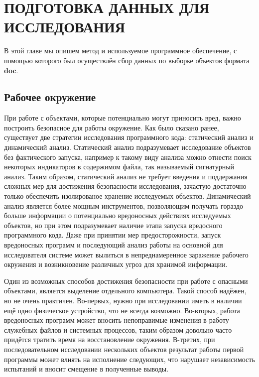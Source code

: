 \chapter{ПОДГОТОВКА ДАННЫХ ДЛЯ ИССЛЕДОВАНИЯ}

В этой главе мы опишем метод и используемое программное обеспечение, с помощью которого был осуществлён сбор данных по выборке объектов формата \textbf{doc}.

\section{Рабочее окружение}

При работе с объектами, которые потенциально могут приносить вред, важно построить безопасное для работы окружение.
Как было сказано ранее, существует две стратегии исследования программного кода: статический анализ и динамический анализ.
Статический анализ подразумевает исследование объектов без фактического запуска, например к такому виду анализа можно отнести поиск некоторых индикаторов в содержимом файла, так называемый сигнатурный анализ.
Таким образом, статический анализ не требует введения и поддержания сложных мер для достижения безопасности исследования, зачастую достаточно только обеспечить изолированое хранение исследуемых объектов.
Динамический анализ является более мощным инструментов, позволяющим получать гораздо больше информации о потенциально вредоносных действиях исследуемых объектов, но при этом подразумевает наличие этапа запуска вредосного программного кода.
Даже при принятии мер предосторожности, запуск вредоносных программ и последующий анализ работы на основной для исследователя системе может вылиться в непреднамеренное заражение рабочего окружения и возникновение различных угроз для хранимой информации.

Один из возможных способов достижения безопасности при работе с опасными объектами, является выделение отдельного компьютера.
Такой способ надёжен, но не очень практичен. Во-первых, нужно при исследовании иметь в наличии ещё одно физическое устройство, что не всегда возможно.
Во-вторых, работа вредоносных программ может вносить непоправимые изменения в работу служебных файлов и системных процессов, таким образом довольно часто придётся тратить время на восстановление окружения.
В-третих, при последовательном исследовании нескольких объектов результат работы первой программы может влиять на исполнение следующих, что нарушает независимость испытаний и вносит смещение в полученные выводы.

